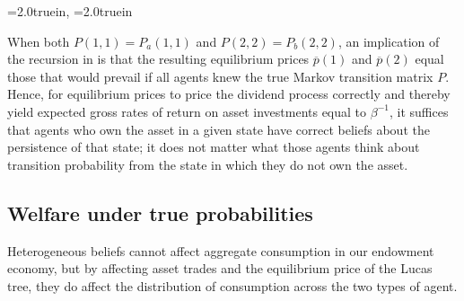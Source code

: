\centerline{\epsfxsize=2.0truein, \epsfxsize=2.0truein}
\caption{True expected net rates of return on
asset investments by agents of type $a$ in the
left panel and type $b$ in the right panel. The 
returns are functions of the persistence of the 
state in which investments are made, i.e.,
the true probabilities $P(1,1)$ and $P(2,2)$, 
respectively.}
\endfigure
\medskip


When both $P(1,1)=P_a(1,1)$ and $P(2,2)=P_b(2,2)$,
an implication of the recursion in 
 is that the resulting equilibrium
prices $\overline p(1)$ and $\overline p(2)$ equal those
 that would prevail if all agents knew the
true Markov transition matrix $P$. Hence, for
equilibrium prices   to price  the 
dividend process correctly and thereby yield expected gross 
rates of return on asset investments equal to 
$\beta^{-1}$, it suffices that  agents who own the asset in a given state  have 
correct beliefs about the persistence of that state; 
it does not matter what those agents think 
about  transition probability from the  
state in which they do not own the asset.


\subsection{Welfare under  true probabilities}
Heterogeneous beliefs cannot affect  aggregate 
consumption in our endowment economy,  but by affecting  asset trades and the  equilibrium price of  the 
Lucas tree, they do affect the 
distribution of consumption across the two types of agent. 

